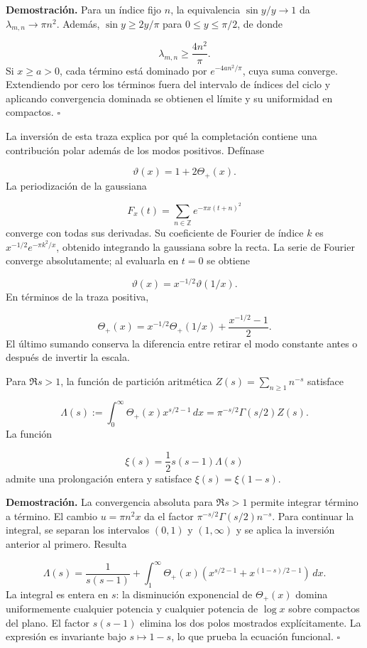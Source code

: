 \textbf{Demostración.} Para un índice fijo \(n\), la equivalencia \(\sin y/y\to1\) da \(\lambda_{m,n}\to\pi n^2\). Además, \(\sin y\geq2y/\pi\) para \(0\leq y\leq\pi/2\), de donde

\[
\lambda_{m,n}\geq\frac{4n^2}{\pi}.
\]
Si \(x\geq a>0\), cada término está dominado por \(e^{-4an^2/\pi}\), cuya suma converge. Extendiendo por cero los términos fuera del intervalo de índices del ciclo y aplicando convergencia dominada se obtienen el límite y su uniformidad en compactos. \hfill\(\square\)

La inversión de esta traza explica por qué la completación contiene una contribución polar además de los modos positivos. Defínase

\[
\vartheta(x)=1+2\Theta_+(x).
\]
La periodización de la gaussiana

\[
F_x(t)=\sum_{n\in\mathbb Z}e^{-\pi x(t+n)^2}
\]
converge con todas sus derivadas. Su coeficiente de Fourier de índice \(k\) es \(x^{-1/2}e^{-\pi k^2/x}\), obtenido integrando la gaussiana sobre la recta. La serie de Fourier converge absolutamente; al evaluarla en \(t=0\) se obtiene

\[
\vartheta(x)=x^{-1/2}\vartheta(1/x).
\]
En términos de la traza positiva,

\[
\Theta_+(x)=x^{-1/2}\Theta_+(1/x)+\frac{x^{-1/2}-1}{2}.
\]
El último sumando conserva la diferencia entre retirar el modo constante antes o después de invertir la escala.

Para \(\Re s>1\), la función de partición aritmética \(Z(s)=\sum_{n\geq1}n^{-s}\) satisface

\[
\Lambda(s):=\int_0^\infty\Theta_+(x)x^{s/2-1}\,dx
=\pi^{-s/2}\Gamma(s/2)Z(s).
\]
La función

\[
\xi(s)=\frac12s(s-1)\Lambda(s)
\]
admite una prolongación entera y satisface \(\xi(s)=\xi(1-s)\).

\textbf{Demostración.} La convergencia absoluta para \(\Re s>1\) permite integrar término a término. El cambio \(u=\pi n^2x\) da el factor \(\pi^{-s/2}\Gamma(s/2)n^{-s}\). Para continuar la integral, se separan los intervalos \((0,1)\) y \((1,\infty)\) y se aplica la inversión anterior al primero. Resulta

\[
\Lambda(s)=\frac1{s(s-1)}
+\int_1^\infty\Theta_+(x)
\left(x^{s/2-1}+x^{(1-s)/2-1}\right)\,dx.
\]
La integral es entera en \(s\): la disminución exponencial de \(\Theta_+(x)\) domina uniformemente cualquier potencia y cualquier potencia de \(\log x\) sobre compactos del plano. El factor \(s(s-1)\) elimina los dos polos mostrados explícitamente. La expresión es invariante bajo \(s\mapsto1-s\), lo que prueba la ecuación funcional. \hfill\(\square\)


